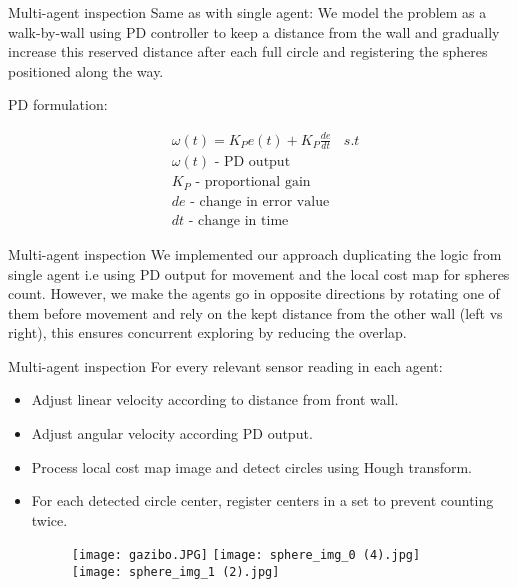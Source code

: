\documentclass[10pt]{beamer}
\begin{document}
\begin{frame}{Multi-agent inspection}
    Same as with single agent: We model the problem as a walk-by-wall using PD controller to keep a distance from the wall and gradually increase this reserved distance after each full circle and registering the spheres positioned along the way.
    
    PD formulation:

\begin{align*} 
&\omega(t)=K_{P} e(t)+K_{P} \frac{d e}{d t}\ \ \ \ s.t\\
&\omega(t)\text{ - PD output }\\
&K_{P}\text{ - proportional gain }\\
&de\text{ - change in error value }\\
&dt\text{ - change in time } 
\end{align*}    

\end{frame}

\begin{frame}{Multi-agent inspection}
We implemented our approach duplicating the logic from single agent i.e using PD output for movement and the local cost map  for spheres count. However, we make the agents go in opposite directions by rotating one of them before movement and rely on the kept distance from the other wall (left vs right), this ensures concurrent exploring by reducing the overlap.
\end{frame}

\begin{frame}{Multi-agent inspection}
For every relevant sensor reading in each agent:
\graphicspath{{images/}}
\begin{itemize}
    \item Adjust linear velocity according to distance from front wall.
    \item Adjust angular velocity according PD output.
    \item Process local cost map image and detect circles using Hough transform.
    \item For each detected circle center, register centers in a set to prevent counting twice.
    \bigskip
    
    \begin{figure}[htp]
    \texttt{[image: gazibo.JPG]}
    \texttt{[image: sphere\_img\_0 (4).jpg]}
    \texttt{[image: sphere\_img\_1 (2).jpg]}

    \label{fig:galaxy}
\end{figure}
\end{itemize}
\end{frame}
\end{document}
